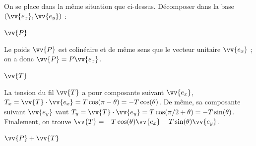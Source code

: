On se place dans la même situation que ci-dessus.
Décomposer dans la base $(\vv{e_x}, \vv{e_y})$ : 

\smallskip

\debutEntrainement

\begin{enonce}
	$\vv{P}$
\end{enonce}


\begin{corrige}
  Le poids $\vv{P}$ est colinéaire et de même sens que le vecteur unitaire $\vv{e_x}$ ; on a donc $\vv{P}=P\vv{e_x}$.
\end{corrige}


\begin{enonce}
	$\vv{T}$
\end{enonce}


\begin{corrige}
La tension du fil $\vv{T}$ a pour composante suivant $\vv{e_x}$, $T_x=\vv{T}\cdot \vv{e_x}=T\cos(\pi-\theta)=-T\cos(\theta)$. De même, sa composante suivant $\vv{e_y}$ vaut $T_y=\vv{T}\cdot \vv{e_y}=T\cos(\pi/2+\theta)=-T\sin(\theta)$. Finalement, on trouve $\vv{T}=-T\cos(\theta)\vv{e_x}-T\sin(\theta)\vv{e_y}$.
\end{corrige}


\begin{enonce}
	$\vv{P}+\vv{T}$
\end{enonce}



\finEntrainement





